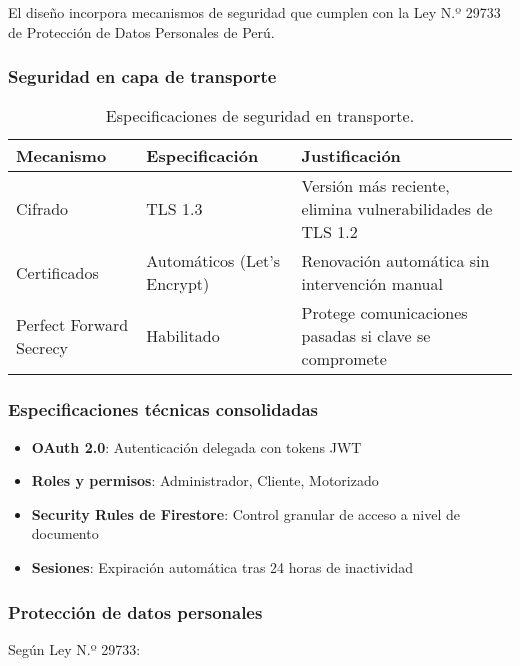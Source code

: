El diseño incorpora mecanismos de seguridad que cumplen con la Ley N.º 29733 de Protección de Datos Personales de Perú.

\subsubsection{Seguridad en capa de transporte}

\begin{table}[H]
\centering
\caption{Especificaciones de seguridad en transporte.}
\label{tab:seguridad_transporte}
\begin{tabular}{@{}p{4cm}p{3.5cm}p{5.5cm}@{}}
\toprule
\textbf{Mecanismo} & \textbf{Especificación} & \textbf{Justificación} \\
\midrule
Cifrado & TLS 1.3 & Versión más reciente, elimina vulnerabilidades de TLS 1.2 \\
\midrule
Certificados & Automáticos (Let's Encrypt) & Renovación automática sin intervención manual \\
\midrule
Perfect Forward Secrecy & Habilitado & Protege comunicaciones pasadas si clave se compromete \\
\bottomrule
\end{tabular}
\end{table}

\subsubsection{Especificaciones técnicas consolidadas}

\begin{itemize}
    \item \textbf{OAuth 2.0}: Autenticación delegada con tokens JWT
    \item \textbf{Roles y permisos}: Administrador, Cliente, Motorizado
    \item \textbf{Security Rules de Firestore}: Control granular de acceso a nivel de documento
    \item \textbf{Sesiones}: Expiración automática tras 24 horas de inactividad
\end{itemize}

\subsubsection{Protección de datos personales}

Según Ley N.º 29733:

